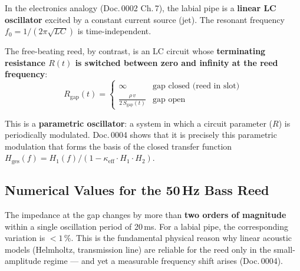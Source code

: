 \documentclass[11pt,a4paper]{article}
\begin{document}
In the electronics analogy (Doc.\,0002 Ch.\,7), the labial pipe is a \textbf{linear LC oscillator} excited by a constant current source (jet). The resonant frequency $f_0 = 1/(2\pi\sqrt{LC})$ is time-independent.

The free-beating reed, by contrast, is an LC circuit whose \textbf{terminating resistance $R(t)$ is switched between zero and infinity at the reed frequency}:
\begin{equation}
R_\text{gap}(t) = \begin{cases}
\infty & \text{gap closed (reed in slot)} \\
\displaystyle\frac{\rho\, v}{2\, S_\text{gap}(t)} & \text{gap open}
\end{cases}
\end{equation}

This is a \textbf{parametric oscillator}: a system in which a circuit parameter ($R$) is periodically modulated. Doc.\,0004 shows that it is precisely this parametric modulation that forms the basis of the closed transfer function $H_\text{ges}(f) = H_1(f) / (1 - \kappa_\text{eff} \cdot H_1 \cdot H_2)$.

\subsection{Numerical Values for the 50\,Hz Bass Reed}

\begin{table}[H]
\centering\small
{}
\caption{Acoustic gap impedance at various phases of the oscillation cycle (at 1\,kPa bellows pressure). Factor between minimum and maximum: $\sim$200.}
\end{table}

\begin{warnbox}
The impedance at the gap changes by more than \textbf{two orders of magnitude} within a single oscillation period of 20\,ms. For a labial pipe, the corresponding variation is $< 1\,\%$. This is the fundamental physical reason why linear acoustic models (Helmholtz, transmission line) are reliable for the reed only in the small-amplitude regime --- and yet a measurable frequency shift arises (Doc.\,0004).
\end{warnbox}
\end{document}
